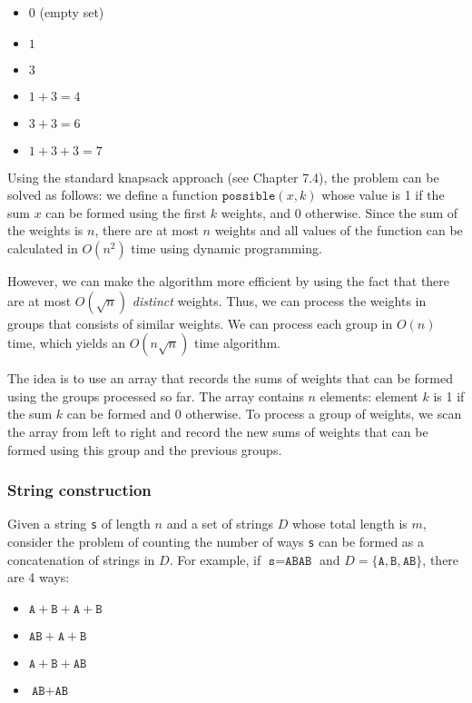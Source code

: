 \begin{itemize}[noitemsep]
    \item $0$ (empty set)
    \item $1$
    \item $3$
    \item $1+3=4$
    \item $3+3=6$
    \item $1+3+3=7$
\end{itemize}

Using the standard knapsack approach (see Chapter 7.4),
the problem can be solved as follows:
we define a function $\texttt{possible}(x,k)$ whose value is 1
if the sum $x$ can be formed using the first $k$ weights,
and 0 otherwise.
Since the sum of the weights is $n$,
there are at most $n$ weights and
all values of the function can be calculated
in $O(n^2)$ time using dynamic programming.

However, we can make the algorithm more efficient
by using the fact that there are at most $O(\sqrt n)$
\emph{distinct} weights.
Thus, we can process the weights in groups
that consists of similar weights.
We can process each group
in $O(n)$ time, which yields an $O(n \sqrt n)$ time algorithm.

The idea is to use an array that records the sums of weights
that can be formed using the groups processed so far.
The array contains $n$ elements: element $k$ is 1 if the sum
$k$ can be formed and 0 otherwise.
To process a group of weights, we scan the array
from left to right and record the new sums of weights that
can be formed using this group and the previous groups.

\subsubsection{String construction}

Given a string \texttt{s} of length $n$
and a set of strings $D$ whose total length is $m$,
consider the problem of counting the number of ways
\texttt{s} can be formed as a concatenation of strings in $D$.
For example,
if $\texttt{s}=\texttt{ABAB}$ and
$D=\{\texttt{A},\texttt{B},\texttt{AB}\}$,
there are 4 ways:

\begin{itemize}[noitemsep]
    \item $\texttt{A}+\texttt{B}+\texttt{A}+\texttt{B}$
    \item $\texttt{AB}+\texttt{A}+\texttt{B}$
    \item $\texttt{A}+\texttt{B}+\texttt{AB}$
    \item $\texttt{AB}+\texttt{AB}$
\end{itemize}

